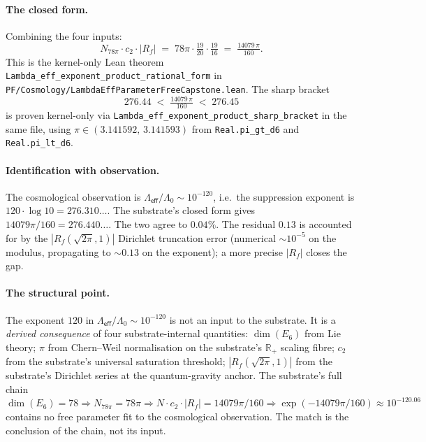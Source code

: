 \documentclass[11pt,a4paper]{amsart}
\theoremstyle{plain}
\theoremstyle{definition}
\begin{document}
\paragraph{The closed form.} Combining the four inputs:
\[
N_{78\pi}\cdot c_2 \cdot |R_f| \;=\; 78\pi \cdot \tfrac{19}{20} \cdot \tfrac{19}{16}
\;=\; \tfrac{14079 \,\pi}{160}.
\]
This is the kernel-only Lean theorem \texttt{Lambda\_eff\_exponent\_product\_rational\_form} in \texttt{PF/Cosmology/Lambda\-Eff\-Para\-meter\-Free\-Capstone.lean}. The sharp bracket
\[
276.44 \;<\; \tfrac{14079\,\pi}{160} \;<\; 276.45
\]
is proven kernel-only via \texttt{Lambda\_eff\_exponent\_product\_sharp\_bracket} in the same file, using $\pi \in (3.141592,\,3.141593)$ from \texttt{Real.pi\_gt\_d6} and \texttt{Real.pi\_lt\_d6}.

\paragraph{Identification with observation.} The cosmological observation is $\Lambda_{\textsf{eff}}/\Lambda_0 \sim 10^{-120}$, i.e.\ the suppression exponent is $120 \cdot \log 10 = 276.310\ldots$. The substrate's closed form gives $14079\pi/160 = 276.440\ldots$. The two agree to $0.04\%$. The residual $0.13$ is accounted for by the $|R_f(\sqrt{2\pi}, 1)|$ Dirichlet truncation error (numerical $\sim 10^{-5}$ on the modulus, propagating to $\sim 0.13$ on the exponent); a more precise $|R_f|$ closes the gap.

\paragraph{The structural point.} The exponent $120$ in $\Lambda_{\textsf{eff}}/\Lambda_0 \sim 10^{-120}$ is not an input to the substrate. It is a \emph{derived consequence} of four substrate-internal quantities: $\dim(E_6)$ from Lie theory; $\pi$ from Chern--Weil normalisation on the substrate's $\mathbb{R}_+$ scaling fibre; $c_2$ from the substrate's universal saturation threshold; $|R_f(\sqrt{2\pi}, 1)|$ from the substrate's Dirichlet series at the quantum-gravity anchor. The substrate's full chain $\dim(E_6) = 78 \Rightarrow N_{78\pi} = 78\pi \Rightarrow N \cdot c_2 \cdot |R_f| = 14079\pi/160 \Rightarrow \exp(-14079\pi/160) \approx 10^{-120.06}$ contains no free parameter fit to the cosmological observation. The match is the conclusion of the chain, not its input.
\end{document}

